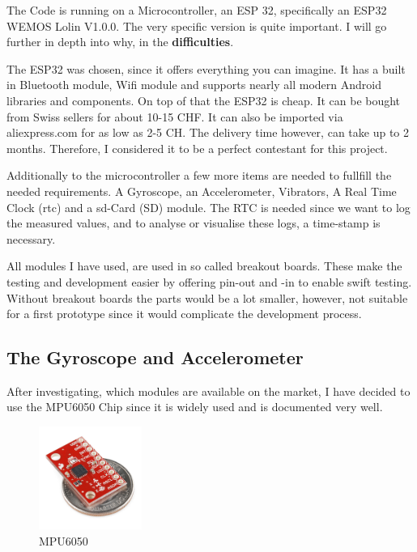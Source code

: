 The Code is running on a \gls{Microcontroller}, an ESP 32, specifically an ESP32 WEMOS Lolin V1.0.0. The very specific version is quite important. I will go further in depth into why, in the \textbf{difficulties}.

The \gls{ESP32} was chosen, since it offers everything you can imagine. It has a built in Bluetooth module, Wifi module and supports nearly all modern Android libraries and components. On top of that the ESP32 is cheap. It can be bought from Swiss sellers for about 10-15 CHF. It can also be imported via aliexpress.com for as low as 2-5 CH. The delivery time however, can take up to 2 months. Therefore, I considered it to be a perfect contestant for this project. 

Additionally to the microcontroller a few more items are needed to fullfill the needed requirements. A Gyroscope, an Accelerometer, Vibrators, A Real Time Clock (\acrshort{rtc}) and a \acrshort{sd}-Card (\gls{SD}) module. The \gls{RTC} is needed since we want to log the measured values, and to analyse or visualise these logs, a time-stamp is necessary. 

All modules I have used, are used in so called breakout boards. These make the testing and development easier by offering pin-out and -in to enable swift testing. Without breakout boards the parts would be a lot smaller, however, not suitable for a first prototype since it would complicate the development process.

\subsection{The Gyroscope and Accelerometer}

After investigating, which modules are available on the market, I have decided to use the 
\gls{MPU6050} Chip since it is widely used and is documented very well. 

\begin{figure}
  \begin{center}
\includegraphics[width=0.3\textwidth]{images/MPU_6050.jpg}
  \end{center}
  \caption{MPU6050}
  \label{fig:MPU6050}
\end{figure}

